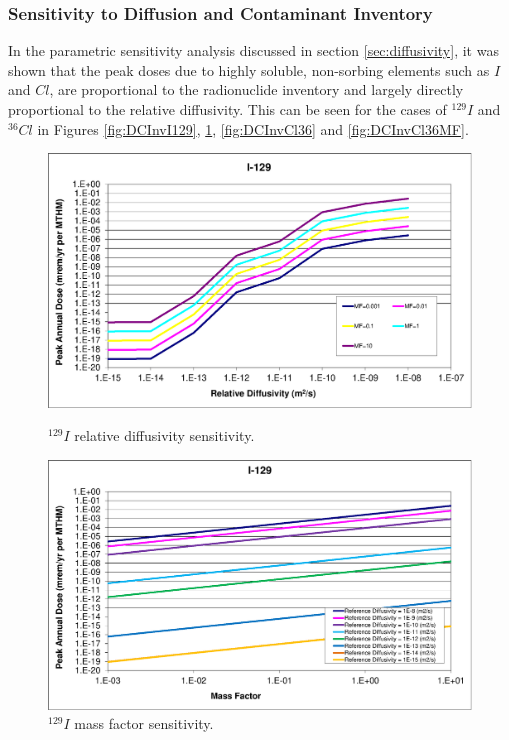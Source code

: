 
\subsubsection{Sensitivity to Diffusion and Contaminant Inventory}

In the parametric sensitivity analysis discussed in section
\ref{sec:diffusivity}, it was shown that
the peak doses due to highly soluble, non-sorbing elements such as $I$ and $Cl$, 
are  proportional to the radionuclide inventory and 
largely directly proportional to the relative diffusivity. This can be seen for 
the cases of $^{129}I$ and $^{36}Cl$ in Figures \ref{fig:DCInvI129}, 
\ref{fig:DCInvI129MF}, \ref{fig:DCInvCl36} and \ref{fig:DCInvCl36MF}.

\begin{figure}[ht]
\centering
\begin{minipage}[b]{0.45\linewidth}

\includegraphics[width=\linewidth]{./chapters/nuclide_sensitivity/clay/DiffCoeffAndInvEBSFail/I-129.eps}
\caption{$^{129}I$ relative diffusivity sensitivity.}
\label{fig:DCInvI129}

\end{minipage}
\hspace{0.05\linewidth}
\begin{minipage}[b]{0.45\linewidth}

\includegraphics[width=\linewidth]{./chapters/nuclide_sensitivity/clay/DiffCoeffAndInvEBSFail/I-129-MF.eps}
\caption{$^{129}I$ mass factor sensitivity.}
\label{fig:DCInvI129MF}

\end{minipage}
\end{figure}

